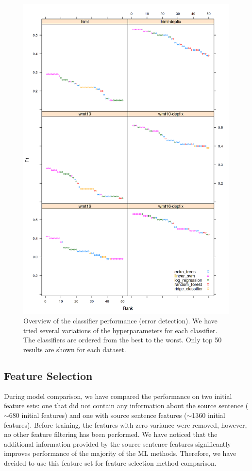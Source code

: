 \begin{figure}
\centering
  \includegraphics[scale=0.7]{wf-class}
  \caption{
    Overview of the classifier performance (error detection).
We have tried several variations of the hyperparameters
for each classifier. The classifiers are ordered from the best to the worst. Only top 50 results
are shown for each dataset.
}
  \label{wf-draft}
\end{figure}

\subsection{Feature Selection}

During model comparison, we have compared the performance on two initial feature sets:
one that did not contain any information about the source sentence ($\sim$680 initial features)
and one with source sentence features ($\sim$1360 initial features). Before training,
the features with zero variance were removed, however, no other feature filtering has been
performed. We have noticed that the additional information provided by the source sentence features
significantly improves performance of the majority of the ML methods. Therefore, we have decided
to use this feature set for feature selection method comparison.

